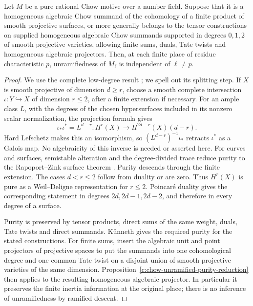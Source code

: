 \begin{corollary}
\label{c:surface-lowdegree-chow-unramified}
Let $M$ be a pure rational Chow motive over a number field.  Suppose
that it is a homogeneous algebraic Chow summand of the cohomology of
a finite product of smooth projective surfaces, or more generally
belongs to the tensor constructions on supplied homogeneous algebraic
Chow summands supported in degrees $0,1,2$ of smooth projective
varieties, allowing finite sums, duals, Tate twists and homogeneous
algebraic projectors.  Then, at each finite place of residue
characteristic $p$, unramifiedness of $M_\ell$ is independent of
$\ell\ne p$.
\end{corollary}
\begin{proof}
We use the complete low-degree result
\citep[Lemma~3.9, author p.~42]{c_saito2003weights}; we spell out its
splitting step.  If $X$ is smooth projective of dimension $d\ge r$,
choose a smooth complete intersection $\iota:Y\hookrightarrow X$ of
dimension $r\le2$, after a finite extension if necessary.  For an ample
class $L$, with the degrees of the chosen hypersurfaces included in
its nonzero scalar normalization, the projection formula gives
\[
 \iota_*\iota^*=L^{d-r}:
 H^r(X)\longrightarrow H^{2d-r}(X)(d-r).
\]
Hard Lefschetz makes this an isomorphism, so
$(L^{d-r})^{-1}\iota_*$ retracts $\iota^*$ as a Galois map.  No
algebraicity of this inverse is needed or asserted here.  For curves
and surfaces, semistable alteration and the degree-divided trace
reduce purity to the Rapoport--Zink surface theorem
\citep[Satz~2.13]{c_rapoportzink1982}.  Purity descends through the
finite extension.  The cases $d<r\le2$ follow from duality or are zero.
Thus $H^r(X)$ is pure as a Weil--Deligne representation for $r\le2$.
Poincar\'e duality gives the corresponding statement in degrees
$2d,2d-1,2d-2$, and therefore in every degree of a surface.

Purity is preserved by tensor products, direct sums of the same
weight, duals, Tate twists and direct summands.  K\"unneth gives the
required purity for the stated constructions.  For finite sums, insert
the algebraic unit and point projectors of projective spaces to put
the summands into one cohomological degree and one common Tate twist
on a disjoint union of smooth projective varieties of the same
dimension.  Proposition~\ref{c:chow-unramified-purity-reduction}
then applies to the resulting homogeneous algebraic projector.  In particular it preserves the
finite inertia information at the original place; there is no
inference of unramifiedness by ramified descent.
\end{proof}

